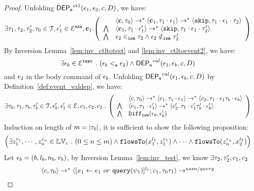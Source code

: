 \begin{proof}
Unfolding $\mathsf{DEP_{\mathtt{e}}}^{\mathtt{{ctl}}}(\mathtt{\epsilon}_1, \mathtt{\epsilon}_2, c, D)$, we have:
%
\[
\exists \vtrace_1, \vtrace_2, \vtrace_2', \vtrace_0 \in \mathcal{T}, 
\event_1' \in \eventset^{\asn}, \ssa{c}_1.
\left(
\begin{array}{ll}   
  & \config{\ssa{c}, \vtrace_0} \rightarrow^{*} 
    \config{\ssa{c}_1, \vtrace_1 \cdot \event_1}  \rightarrow^{*} 
    \config{\eskip,  \vtrace_1 \cdot \event_1 \cdot \vtrace_2} 
  \\ 
  \bigwedge &
  \config{\ssa{c}_1, \vtrace_1 \cdot \event_1'}  \rightarrow^{*} 
  \config{\eskip,  \vtrace_1 \cdot \event_1 \cdot \vtrace_2' } 
  \\
  \bigwedge &
  \event_2 \ismin \vtrace_2 \land \event_2 \notismin \vtrace_2'
\end{array}
\right)
 \]
 By {Inversion Lemma~\ref{lem:inv_ctltotest} and \ref{lem:inv_ctltoevent2}}, we have:
 \[
   \exists \mathtt{\epsilon}_b \in \mathcal{E}^{\mathtt{{test}}} ~.~ (\mathtt{\epsilon}_b <_{\mathtt{e}} \mathtt{\epsilon}_2) \land \mathsf{DEP_{\mathtt{e}}}^{val}(\mathtt{\epsilon}_1, \mathtt{\epsilon}_b, c, D)
 \]
 and $\mathtt{\epsilon}_2$ in the body command of $\mathtt{\epsilon}_b$.
 Unfolding $\mathsf{DEP_{\mathtt{e}}}^{val}(\mathtt{\epsilon}_1, \mathtt{\epsilon}_b, c, D)$ by Definition~\ref{def:event_valdep}, we have:
\[
\exists \vtrace_0, \vtrace_1, \vtrace_b, \vtrace_b' \in \mathcal{T},  \event_b', \event_1' \in \eventset, 
{c}_1, {c}_2, {c}_2 \st
  \left(
  \begin{array}{ll}   
 & \config{{c}, \vtrace_0} \rightarrow^{*} 
  \config{{c}_1, \vtrace_1 \cdot \event_1}  \rightarrow^{*} 
  \config{{c}_2,  \vtrace_1 \cdot \event_1 \vtrace_b \cdot \event_b } 
  \\ 
  \bigwedge &
  \config{{c}_1, \vtrace_1 \cdot \event_1'}  \rightarrow^{*} 
  \config{{c}_2',  \vtrace_1 \cdot \event_1' \vtrace_b' \cdot \event_b' } 
  \\
  \bigwedge &
   \ismdiff(\event_b,\event_b')
\end{array}
\right)
 \]
Induction on length of $m = |\mathtt{\tau}_b|$, it is sufficient to show the following proposition:
%
\[
\Big(\exists z_1^{r_1}, \cdots, z_n^{r_n} \in \mathbb{LV}_{{c}} ~.~ (0 \leq n \leq m )
 \land \mathtt{flowsTo}(x_1^{l_1}, z_1^{r_1}) \land \cdots \land \mathtt{flowsTo}(z_n^{r_n}, {x}_2^{l_2}) \Big)
\]
%
 Let $\mathtt{\epsilon}_b = (b, l_b, n_b, v_b)$, by {Inversion Lemma~\ref{lem:inv_test}},
we know $\exists \mathtt{\tau}_2, \mathtt{\tau}_2', {c}_1, {c}_2$
 \[
  \begin{array}{l}   
  \langle {c}, \mathtt{\tau}_0 \rangle 
  \rightarrow^{*} 
  \langle [\mathrel{ {x}_1 \leftarrow e_1~ or ~ {\tt query}(\psi_1) }]^{l_1} ; {c}_1, \mathtt{\tau}_0 \mathtt{\tau}_1 \rangle  \rightarrow^{assn/query}

\end{array}\]
\end{proof}
